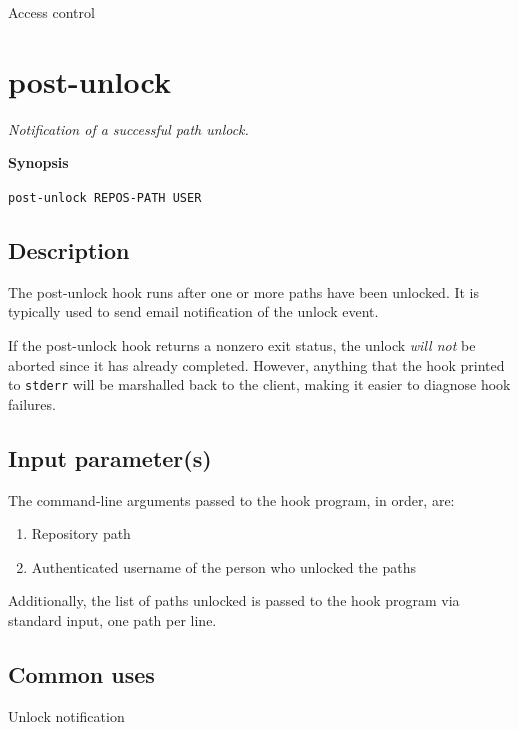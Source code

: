 Access control

\section{post-unlock}\label{svn.ref.reposhooks.post-unlock}

\emph{Notification of a successful path unlock.}

\textbf{Synopsis}

\texttt{post-unlock\ REPOS-PATH\ USER}

\subsection{Description}

The post-unlock hook runs after one or more paths have been unlocked. It
is typically used to send email notification of the unlock event.

If the post-unlock hook returns a nonzero exit status, the unlock
\emph{will not} be aborted since it has already completed. However,
anything that the hook printed to \texttt{stderr} will be marshalled
back to the client, making it easier to diagnose hook failures.

\subsection{Input parameter(s)}

The command-line arguments passed to the hook program, in order, are:

\begin{enumerate}
\def\labelenumi{\arabic{enumi}.}
\item
  Repository path
\item
  Authenticated username of the person who unlocked the paths
\end{enumerate}

Additionally, the list of paths unlocked is passed to the hook program
via standard input, one path per line.

\subsection{Common uses}

Unlock notification

